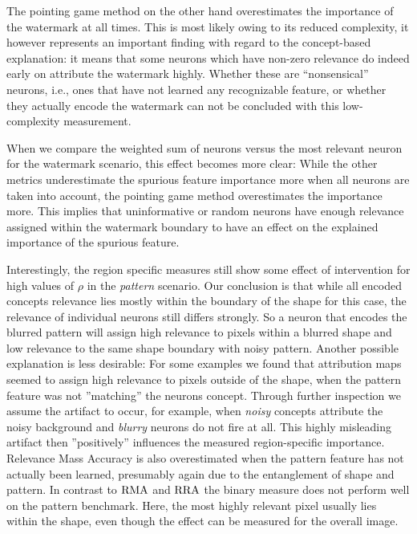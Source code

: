The pointing game method on the other hand overestimates the importance of the watermark at all times. This is most likely owing to its reduced complexity, it however represents an important finding with regard to the concept-based explanation: it means that some neurons which have non-zero relevance do indeed early on attribute the watermark highly. Whether these are ``nonsensical'' neurons, i.e., ones that have not learned any recognizable feature, or whether they actually encode the watermark can not be concluded with this low-complexity measurement. 

When we compare the weighted sum of neurons versus the most relevant neuron for the watermark scenario, this effect becomes more clear: While the other metrics underestimate the spurious feature importance more when all neurons are taken into account, the pointing game method overestimates the importance more. 
This implies that uninformative or random neurons have enough relevance assigned within the watermark boundary to have an effect on the explained importance of the spurious feature. 

Interestingly, the region specific measures still show some effect of intervention for high values of $\rho$ in the \textit{pattern} scenario. 
Our conclusion is that while all encoded concepts relevance lies mostly within the boundary of the shape for this case, the relevance of individual neurons still differs strongly. So a neuron that encodes the blurred pattern will assign high relevance to pixels within a blurred shape and low relevance to the same shape boundary with noisy pattern. 
Another possible explanation is less desirable: For some examples we found that attribution maps seemed to assign high relevance to pixels outside of the shape, when the pattern feature was not ''matching'' the neurons concept. Through further inspection we assume the artifact to occur, for example, when \textit{noisy} concepts attribute the noisy background and \textit{blurry} neurons do not fire at all. This highly misleading artifact then ''positively'' influences the measured region-specific importance. Relevance Mass Accuracy is also overestimated when the pattern feature has not actually been learned, presumably again due to the entanglement of shape and pattern.
In contrast to $\operatorname*{RMA}$ and $\operatorname*{RRA}$ the binary measure does not perform well on the pattern benchmark. Here, the most highly relevant pixel usually lies within the shape, even though the effect can be measured for the overall image. 

